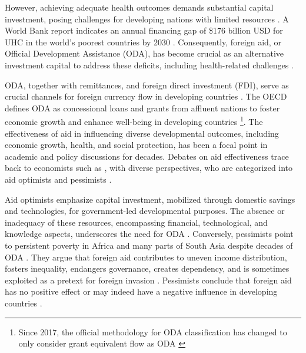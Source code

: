 However, achieving adequate health outcomes demands substantial capital investment, posing challenges for developing nations with limited resources \parencite{world_bank_high-performance_2019}. A World Bank report indicates an annual financing gap of \$176 billion USD for UHC in the world's poorest countries by 2030 \parencite{world_bank_high-performance_2019}. Consequently, foreign aid, or Official Development Assistance (ODA), has become crucial as an alternative investment capital to address these deficits, including health-related challenges \parencite{sachs_case_2014, yogo_health_2015}. 


ODA, together with remittances, and foreign direct investment (FDI), serve as crucial channels for foreign currency flow in developing countries \parencite{scott_lessons_2020}. The OECD defines ODA as concessional loans and grants from affluent nations to foster economic growth and enhance well-being in developing countries \parencite{oecd_ODA_Report_2023} \footnote{Since 2017, the official methodology for ODA classification has changed to only consider grant equivalent flow as ODA \parencite{oecd_ODA_Report_2023}}. The effectiveness of aid in influencing diverse developmental outcomes, including economic growth, health, and social protection, has been a focal point in academic and policy discussions for decades. Debates on aid effectiveness trace back to economists such as \textcite{bauer_dissent_1979, easterly_elusive_2002, milton_foreign_1958, sachs_geography_2001}, with diverse perspectives, who are categorized into aid optimists and pessimists \parencite{kavanagh_governance_2019, nwude_official_2020}.

Aid optimists emphasize capital investment, mobilized through domestic savings and technologies, for government-led developmental purposes. The absence or inadequacy of these resources, encompassing financial, technological, and knowledge aspects, underscores the need for ODA \parencite{sachs_development_2005}. Conversely, pessimists point to persistent poverty in Africa and many parts of South Asia despite decades of ODA \parencite[see][]{yontcheva_macroeconomic_2006}. They argue that foreign aid contributes to uneven income distribution, fosters inequality, endangers governance, creates dependency, and is sometimes exploited as a pretext for foreign invasion \parencite{easterly_can_2003, easterly_are_2007, easterly_can_2009, milton_foreign_1958, easterly_elusive_2002}. Pessimists conclude that foreign aid has no positive effect or may indeed have a negative influence in developing countries \parencite{yontcheva_macroeconomic_2006}.


